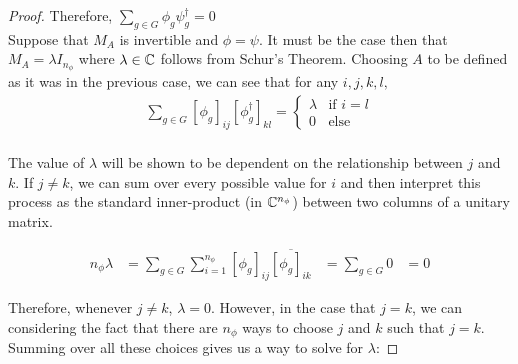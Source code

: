 \begin{proof}
Therefore, $\sum_{g\in G}\phi_{g}\psi_g^{\dag}=0$ \\

Suppose that $M_A$ is invertible and $\phi=\psi$. It must be the case then that $M_A = \lambda I_{n_\phi}$ where $\lambda \in \mathbb{C}$ follows from Schur's Theorem. Choosing $A$ to be defined as it was in the previous case, we can see that for any $i,j,k,l,$
\begin{equation}
	\begin{aligned}
		\sum_{g\in G} \left[\phi_g\right]_{ij}\left[\phi^\dag_g\right]_{kl} = \begin{cases}
																			\lambda &\text{if } i = l\\
																			0 & \text{else}
																			\end{cases}\\
	\end{aligned}
\end{equation}

The value of $\lambda$ will be shown to be dependent on the relationship between $j$ and $k$. If $j\neq k$, we can sum over every possible value for $i$ and then interpret this process as the standard inner-product (in $\mathbb{C}^{n_\phi}$) between two columns of a unitary matrix.

\begin{equation}
	\begin{aligned}
		n_\phi \lambda &= \sum_{g\in G} \sum_{i=1}^{n_\phi}\left[\phi_g\right]_{ij}\overline{\left[\phi_g\right]_{ik}} &= \sum_{g\in G} 0 &= 0
	\end{aligned}
\end{equation}


Therefore, whenever $j\neq k$, $\lambda = 0$. However, in the case that $j=k$, we can considering the fact that there are $n_\phi$ ways to choose $j$ and $k$ such that $j=k$. Summing over all these choices gives us a way to solve for $\lambda$:


\end{proof}
